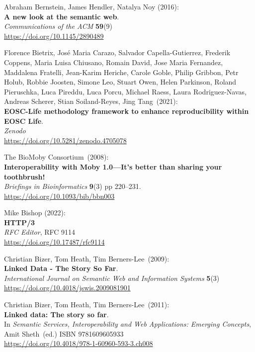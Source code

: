 \begin{thebibliography}{9}
Abraham Bernstein, James Hendler, Natalya Noy (2016): \\
\textbf{A new look at the semantic web}. \\
\emph{Communications of the ACM} \textbf{59}(9) \\
\url{https://doi.org/10.1145/2890489}

Florence Bietrix, José Maria Carazo, Salvador
Capella-Gutierrez, Frederik Coppens, Maria Luisa Chiusano, Romain David,
Jose Maria Fernandez, Maddalena Fratelli, Jean-Karim Heriche, Carole
Goble, Philip Gribbon, Petr Holub, Robbie Joosten, Simone Leo, Stuart
Owen, Helen Parkinson, Roland Pieruschka, Luca Pireddu, Luca Porcu,
Michael Raess, Laura Rodriguez-Navas, Andreas Scherer, Stian
Soiland-Reyes, Jing Tang~(2021):\\
\textbf{EOSC-Life methodology framework to enhance reproducibility
within EOSC Life}.\\
\emph{Zenodo}\\
\url{https://doi.org/10.5281/zenodo.4705078}

The BioMoby Consortium~(2008):\\
\textbf{Interoperability with Moby 1.0---It's better than sharing your
toothbrush!}\\
\emph{Briefings in Bioinformatics} \textbf{9}(3) pp
220--231.\\
\url{https://doi.org/10.1093/bib/bbn003}

Mike Bishop (2022): \\
\textbf{{HTTP}/3}\\
\emph{RFC Editor}, RFC 9114 \\  
\url{https://doi.org/10.17487/rfc9114}

Christian Bizer, Tom Heath, Tim Berners-Lee~(2009):\\
\textbf{Linked Data - The Story So Far}.\\
\emph{International Journal on Semantic Web and Information Systems}
\textbf{5}(3)\\
\url{https://doi.org/10.4018/jswis.2009081901}

Christian Bizer, Tom Heath, Tim Berners-Lee~(2011):\\
\textbf{Linked data: The story so far}.\\
In \emph{Semantic Services, Interoperability and Web Applications:
Emerging Concepts}, Amit Sheth~(ed.) ISBN 9781609605933\\
\url{https://doi.org/10.4018/978-1-60960-593-3.ch008}


\end{thebibliography}
